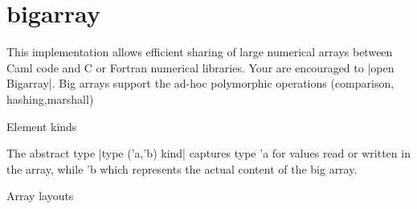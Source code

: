 \section{bigarray}
\label{sec:bigarray}

This implementation allows efficient sharing of large numerical arrays
between Caml code and C or Fortran numerical libraries. Your are
encouraged to |open Bigarray|. Big arrays support the
ad-hoc polymorphic operations (comparison, hashing,marshall)

Element kinds

The abstract type |type ('a,'b) kind| captures type 'a for
values read or written in the array, while 'b which represents the
actual content of the big array.

Array layouts


